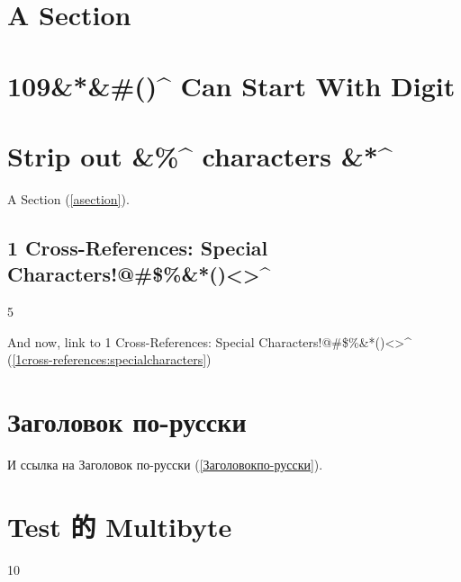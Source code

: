 
\def\mytitle{Cross-References}


\part{A Section}
\label{asection}

\part{109\&*\&\#()\^{} Can Start With Digit}
\label{109canstartwithdigit}

\part{Strip out \&\%\^{} characters \&*\^{}}
\label{stripoutcharacters}

A Section (\autoref{asection}).

\chapter{1 Cross-References: Special Characters!@\#\$\%\&*()<>\^{}}
\label{1cross-references:specialcharacters}

5

And now, link to 1 Cross-References: Special Characters!@\#\$\%\&*()<>\^{} (\autoref{1cross-references:specialcharacters})

\part{Заголовок по-русски}
\label{Заголовокпо-русски}

И ссылка на Заголовок по-русски (\autoref{Заголовокпо-русски}).

\part{Test 的 Multibyte}
\label{test的multibyte}

10



